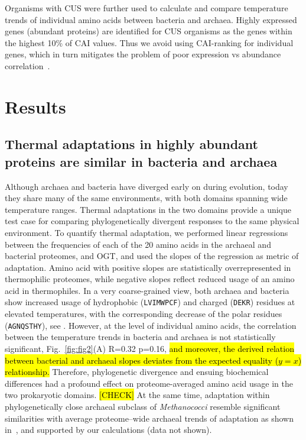 \documentclass[10pt,letterpaper]{article}
\begin{document}
Organisms with CUS were further used to calculate and compare temperature trends of individual amino acids between bacteria and archaea. Highly expressed genes (abundant proteins) are identified for CUS organisms as the genes within the highest 10\% of CAI values. Thus we avoid using CAI-ranking for individual genes, which in turn mitigates the problem of poor expression vs abundance correlation~\cite{Maier2009Correlation}.


\section*{Results}

\subsection*{Thermal adaptations in highly abundant proteins are similar in bacteria and archaea}

Although archaea and bacteria have diverged early on during evolution, today they share many of the same environments, with both domains spanning wide temperature ranges. Thermal adaptations in the two domains provide a unique test case for comparing phylogenetically divergent responses to the same physical environment. To quantify thermal adaptation, we performed linear regressions between the frequencies of each of the 20 amino acids in the archaeal and bacterial proteomes, and OGT, and used the slopes of the regression as metric of adaptation. Amino acid with positive slopes are statistically overrepresented in thermophilic proteomes, while negative slopes reflect reduced usage  of an amino acid in thermophiles.
In a very coarse-grained view, both archaea and bacteria show increased usage of hydrophobic (\texttt{LVIMWPCF}) and charged (\texttt{DEKR}) residues at elevated temperatures, with the corresponding decrease of the polar residues (\texttt{AGNQSTHY}), see .
However, at the level of individual amino acids, the correlation between the temperature trends in bacteria and archaea is not statistically significant, Fig.~\ref{fig:fig2}(A) R=0.32 p=0.16, \hl{and moreover, the derived relation between bacterial and archaeal slopes deviates from the expected equality ($y=x$) relationship.} Therefore, phylogenetic divergence and ensuing biochemical differences had a profound effect on proteome-averaged amino acid usage in the two prokaryotic domains.
\hl{[CHECK]} At the same time, adaptation within phylogenetically close archaeal subclass of {\it Methanococci} resemble significant similarities with average proteome--wide archaeal trends of adaptation as shown in~\cite{Haney1999Thermal}, and supported by our calculations (data not shown).
\end{document}
